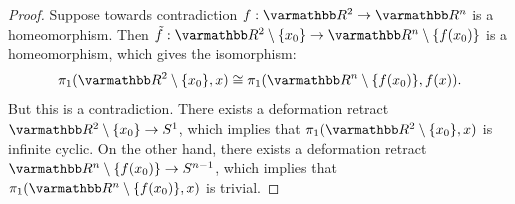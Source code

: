 \documentclass[10pt,oneside,openany]{memoir}
\begin{document}
	\begin{proof}
		Suppose towards contradiction $f:\bfR^2 \rightarrow \bfR^n$ is a homeomorphism. Then \newline$\tilde{f}:\bfR^2 \setminus \{x_0\} \rightarrow \bfR^n \setminus \{f(x_0)\}$ is a homeomorphism, which gives the isomorphism: $$\pi_1(\bfR^2 \setminus \{x_0\},x) \cong \pi_1(\bfR^n \setminus \{f(x_0)\},f(x)).$$ But this is a contradiction. There exists a deformation retract $\bfR^2 \setminus \{x_0\} \rightarrow S^1$, which implies that $\pi_1(\bfR^2 \setminus \{x_0\},x)$ is infinite cyclic. On the other hand, there exists a deformation retract $\bfR^n \setminus \{f(x_0)\} \rightarrow S^{n-1}$, which implies that $\pi_1(\bfR^n \setminus \{f(x_0)\},x)$ is trivial.
	\end{proof}
\newpage
\end{document}
